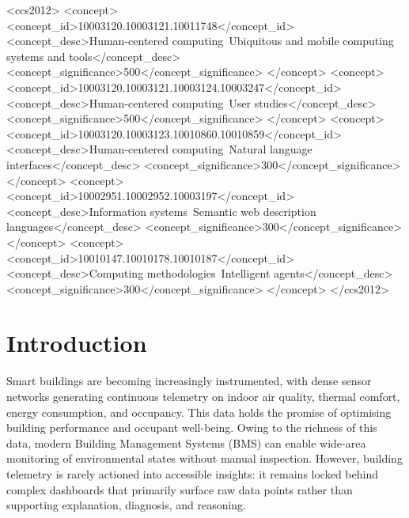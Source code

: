 \documentclass[acmsmall]{acmart}
\begin{document}
\begin{CCSXML}
<ccs2012>
 <concept>
  <concept_id>10003120.10003121.10011748</concept_id>
  <concept_desc>Human-centered computing~Ubiquitous and mobile computing systems and tools</concept_desc>
  <concept_significance>500</concept_significance>
 </concept>
 <concept>
  <concept_id>10003120.10003121.10003124.10003247</concept_id>
  <concept_desc>Human-centered computing~User studies</concept_desc>
  <concept_significance>500</concept_significance>
 </concept>
 <concept>
  <concept_id>10003120.10003123.10010860.10010859</concept_id>
  <concept_desc>Human-centered computing~Natural language interfaces</concept_desc>
  <concept_significance>300</concept_significance>
 </concept>
 <concept>
  <concept_id>10002951.10002952.10003197</concept_id>
  <concept_desc>Information systems~Semantic web description languages</concept_desc>
  <concept_significance>300</concept_significance>
 </concept>
 <concept>
  <concept_id>10010147.10010178.10010187</concept_id>
  <concept_desc>Computing methodologies~Intelligent agents</concept_desc>
  <concept_significance>300</concept_significance>
 </concept>
</ccs2012>
\end{CCSXML}

\maketitle

\section{Introduction}

Smart buildings are becoming increasingly instrumented, with dense sensor networks generating continuous telemetry on indoor air quality, thermal comfort, energy consumption, and occupancy. This data holds the promise of optimising building performance and occupant well-being. Owing to the richness of this data, modern Building Management Systems (BMS) can enable wide-area monitoring of environmental states without manual inspection. However, building telemetry is rarely actioned into accessible insights: it remains locked behind complex dashboards that primarily surface raw data points rather than supporting explanation, diagnosis, and reasoning.
\end{document}
